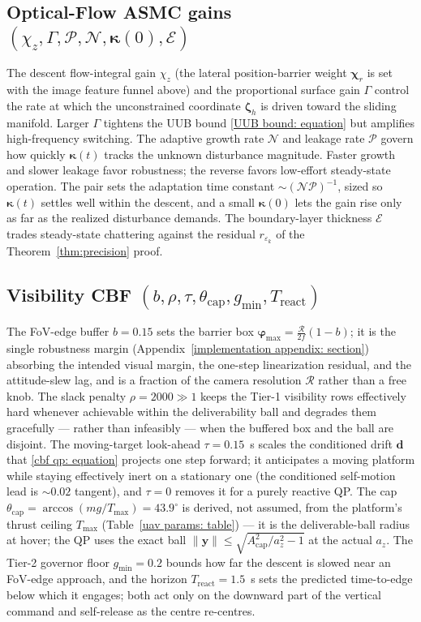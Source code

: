 \documentclass{IEEEtaes}
\theoremstyle{definition}
\theoremstyle{remark}
\begin{document}
\subsection{Optical-Flow ASMC gains $(\chi_z, \Gamma, \mathcal{P}, \mathcal{N}, \boldsymbol{\kappa}(0), \mathcal{E})$} The descent flow-integral gain $\chi_z$ (the lateral position-barrier weight $\boldsymbol{\chi}_r$ is set with the image feature funnel above) and the proportional surface gain $\Gamma$ control the rate at which the unconstrained coordinate $\boldsymbol{\zeta}_h$ is driven toward the sliding manifold. Larger $\Gamma$ tightens the UUB bound \eqref{UUB bound: equation} but amplifies high-frequency switching. The adaptive growth rate $\mathcal{N}$ and leakage rate $\mathcal{P}$ govern how quickly $\boldsymbol{\kappa}(t)$ tracks the unknown disturbance magnitude. Faster growth and slower leakage favor robustness; the reverse favors low-effort steady-state operation. The pair sets the adaptation time constant $\sim(\mathcal{N}\mathcal{P})^{-1}$, sized so $\boldsymbol{\kappa}(t)$ settles well within the descent, and a small $\boldsymbol{\kappa}(0)$ lets the gain rise only as far as the realized disturbance demands. The boundary-layer thickness $\mathcal{E}$ trades steady-state chattering against the residual $r_{\varepsilon_k}$ of the Theorem~\ref{thm:precision} proof.

\subsection{Visibility CBF $(b, \rho, \tau, \theta_\text{cap}, g_\text{min}, T_\text{react})$} The FoV-edge buffer $b=0.15$ sets the barrier box $\boldsymbol{\varphi}_\text{max}=\tfrac{\mathcal{R}}{2f}(1-b)$; it is the single robustness margin (Appendix~\ref{implementation appendix: section}) absorbing the intended visual margin, the one-step linearization residual, and the attitude-slew lag, and is a fraction of the camera resolution $\mathcal{R}$ rather than a free knob. The slack penalty $\rho=2000\gg1$ keeps the Tier-1 visibility rows effectively hard whenever achievable within the deliverability ball and degrades them gracefully --- rather than infeasibly --- when the buffered box and the ball are disjoint. The moving-target look-ahead $\tau=0.15$~s scales the conditioned drift $\boldsymbol{d}$ that \eqref{cbf qp: equation} projects one step forward; it anticipates a moving platform while staying effectively inert on a stationary one (the conditioned self-motion lead is $\sim0.02$ tangent), and $\tau=0$ removes it for a purely reactive QP. The cap $\theta_\text{cap}=\arccos(mg/T_\text{max})=43.9^\circ$ is derived, not assumed, from the platform's thrust ceiling $T_\text{max}$ (Table~\ref{uav params: table}) --- it is the deliverable-ball radius at hover; the QP uses the exact ball $\|\boldsymbol{y}\|\le\sqrt{A_\text{cap}^2/a_z^2-1}$ at the actual $a_z$. The Tier-2 governor floor $g_\text{min}=0.2$ bounds how far the descent is slowed near an FoV-edge approach, and the horizon $T_\text{react}=1.5$~s sets the predicted time-to-edge below which it engages; both act only on the downward part of the vertical command and self-release as the centre re-centres.
\end{document}
